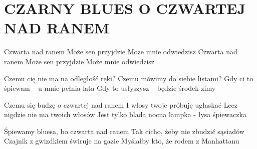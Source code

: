 \documentclass[../../../songbook.tex]{subfiles}
\begin{document}
\TabPositions{8cm} %
\section*{CZARNY BLUES O CZWARTEJ NAD RANEM}
{}
\vspace{0.5cm}
\-\hspace{1cm} Czwarta nad ranem 		 \newline
\-\hspace{1cm} Może sen przyjdzie 		 \newline
\-\hspace{1cm} Może mnie odwiedzisz 	 \newline
\-\hspace{1cm} Czwarta nad ranem 		 \newline
\-\hspace{1cm} Może sen przyjdzie 		 \newline
\-\hspace{1cm} Może mnie odwiedzisz 	 \newline

Czemu cię nie ma na odległość ręki? 	 \newline
Czemu mówimy do siebie listami? 		 \newline
Gdy ci to śpiewam – u mnie pełnia lata	 \newline
Gdy to usłyszysz – będzie środek zimy	 \newline

Czemu się budzę o czwartej nad ranem 			\newline
I włosy twoje próbuję ugłaskać 			\newline
Lecz nigdzie nie ma twoich włosów 			\newline
Jest tylko blada nocna lampka - łysa śpiewaczka  \newline

Śpiewamy bluesa, bo czwarta nad ranem 			\newline
Tak cicho, żeby nie zbudzić sąsiadów 			\newline
Czajnik z gwizdkiem świruje na gazie 			\newline
Myślałby kto, że rodem z Manhattanu 			\newline
\end{document}
